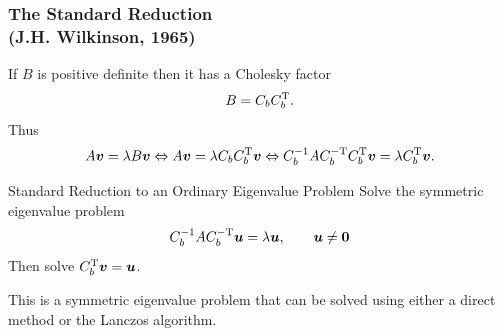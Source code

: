 \documentclass[landscape]{beamer}
\renewcommand{\vec}[1]{\bm{#1}}
\newcommand{\T}{{\rm T}}
\begin{document}
\begin{frame}
  \frametitle{The Standard Reduction\\
    (J.H. Wilkinson, 1965)}
  
  If $B$ is positive definite then it has a Cholesky factor
  \begin{equation*}
    B = C_b C_b^\T.
  \end{equation*}
  Thus
  \begin{equation*}
      A \vec{v} = \lambda B\vec{v} 
      \Leftrightarrow A \vec{v} = \lambda C_b C_b^\T \vec{v}
      \Leftrightarrow C_b^{-1} A C_b^{-\T} C_b^\T \vec{v} = \lambda C_b^{\T} \vec{v}.
  \end{equation*}

  \begin{block}{Standard Reduction to an Ordinary Eigenvalue Problem}
    Solve the symmetric eigenvalue problem
    \begin{equation*}
      C_b^{-1} A C_b^{-\T} \vec{u} = \lambda \vec{u}, \qquad \vec{u} \neq \vec{0}
    \end{equation*}
    Then solve $C_b^\T\vec{v} = \vec{u}$.
  \end{block}
  This is a symmetric eigenvalue problem that can be solved using either a direct method or the Lanczos algorithm.
\end{frame}
\end{document}
